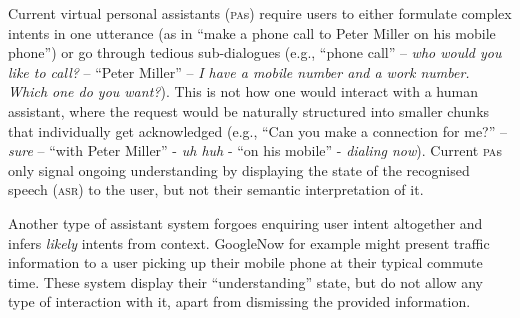\documentclass[11pt]{article}
\newcommand{\asr}[0]{\textsc{asr}}
\newcommand{\pa}[0]{\textsc{pa}}
\begin{document}
Current virtual personal assistants (\pa s) require users to either formulate complex intents in one utterance (as in ``make a phone call to Peter Miller on his mobile phone'') or go through tedious sub-dialogues (e.g., ``phone call'' -- \emph{who would you like to call?} -- ``Peter Miller'' -- \emph{I have a mobile number and a work number. Which one do you want?}). This is not how one would interact with a human assistant, where the request would be naturally structured into smaller chunks that individually get acknowledged (e.g., ``Can you make a connection for me?'' -- \emph{sure} -- ``with Peter Miller'' - \emph{uh huh} - ``on his mobile'' - \emph{dialing now}). Current \pa s only signal ongoing understanding by displaying the state of the recognised speech (\asr) to the user, but not their semantic interpretation of it.


Another type of assistant system forgoes enquiring user intent altogether and infers \emph{likely} intents from context. GoogleNow for example might present traffic information to a user picking up their mobile phone at their typical commute time. These system display their ``understanding'' state, but do not allow any type of interaction with it, apart from dismissing the provided information.
\end{document}
